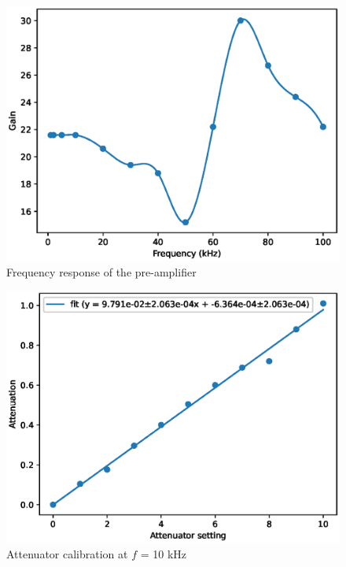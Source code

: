 \documentclass[a4paper]{article}
\begin{document}
\begin{appendices}
\begin{figure}[ht!]
\centering
\includegraphics[width=\textwidth]{fig/python/preamp_freq_response}
\caption{Frequency response of the pre-amplifier}
\label{fig:pre_amp_freq_response}
\end{figure}


\begin{figure}[ht!]
\centering
\includegraphics[width=\textwidth]{fig/python/attenuator}
\caption{Attenuator calibration at $f$ = 10 kHz}
\label{fig:attenuator}
\end{figure}


\end{appendices}
\end{document}
